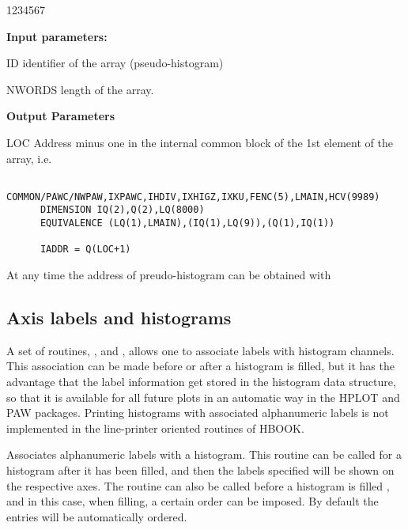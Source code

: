 \begin{DLtt}{1234567}
\item[{\rm\bf Input parameters:}]
\item[ID] identifier of the array (pseudo-histogram)
\item[NWORDS] length of the array.
\item[{\rm\bf Output Parameters}]
\item[LOC] Address minus one in the internal \HBOOK{}
           common block 
           of the 1st element of the array, i.e.
\begin{verbatim}
      COMMON/PAWC/NWPAW,IXPAWC,IHDIV,IXHIGZ,IXKU,FENC(5),LMAIN,HCV(9989)
      DIMENSION IQ(2),Q(2),LQ(8000)
      EQUIVALENCE (LQ(1),LMAIN),(IQ(1),LQ(9)),(Q(1),IQ(1))

      IADDR = Q(LOC+1)
\end{verbatim}
\end{DLtt}

\Remark
At any time the address of preudo-histogram  can
be obtained with 

\newpage%

\subsection{Axis labels and histograms}

A set of routines, ,  and ,
allows one to associate labels with histogram channels.
This association can be made before or after a histogram is filled, but 
it has the advantage that the label information get stored in the
histogram data structure, so that it is available for all future plots in
an automatic way in the HPLOT and PAW packages.
Printing histograms with associated alphanumeric
labels is not implemented in the
line-printer oriented routines of HBOOK.


\Action 
Associates alphanumeric labels with a histogram.
This routine can be called for a histogram after it has been filled,
and then the labels specified will be shown on the respective axes.
The routine can also be called before a histogram is filled ,
and in this case, when filling, a certain order can be imposed.
By default the entries will be automatically ordered.

